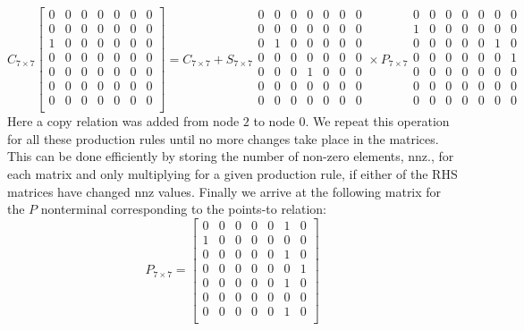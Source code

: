 \[
    C_{7\times 7}
    \begin{bmatrix}
        0 & 0 & 0 & 0 & 0 & 0 & 0 \\
        0 & 0 & 0 & 0 & 0 & 0 & 0 \\
        1 & 0 & 0 & 0 & 0 & 0 & 0 \\
        0 & 0 & 0 & 0 & 0 & 0 & 0 \\
        0 & 0 & 0 & 0 & 0 & 0 & 0 \\
        0 & 0 & 0 & 0 & 0 & 0 & 0 \\
        0 & 0 & 0 & 0 & 0 & 0 & 0 \\
    \end{bmatrix}
    = C_{7\times 7} +
    S_{7\times 7}
    \begin{smallmatrix}
        0 & 0 & 0 & 0 & 0 & 0 & 0 \\
        0 & 0 & 0 & 0 & 0 & 0 & 0 \\
        0 & 1 & 0 & 0 & 0 & 0 & 0 \\
        0 & 0 & 0 & 0 & 0 & 0 & 0 \\
        0 & 0 & 0 & 1 & 0 & 0 & 0 \\
        0 & 0 & 0 & 0 & 0 & 0 & 0 \\
        0 & 0 & 0 & 0 & 0 & 0 & 0 \\
    \end{smallmatrix}
    \times
    P_{7\times 7}
    \begin{smallmatrix}
        0 & 0 & 0 & 0 & 0 & 0 & 0 \\
        1 & 0 & 0 & 0 & 0 & 0 & 0 \\
        0 & 0 & 0 & 0 & 0 & 1 & 0 \\
        0 & 0 & 0 & 0 & 0 & 0 & 1 \\
        0 & 0 & 0 & 0 & 0 & 0 & 0 \\
        0 & 0 & 0 & 0 & 0 & 0 & 0 \\
        0 & 0 & 0 & 0 & 0 & 0 & 0 \\
    \end{smallmatrix}
\]
Here a copy relation was added from node $2$ to node $0$.
We repeat this operation for all these production rules until no more changes take place in the matrices.
This can be done efficiently by storing the number of non-zero elements, nnz., for each matrix and only multiplying for a given production rule, if either of the RHS matrices have changed nnz values.
Finally we arrive at the following matrix for the $P$ nonterminal corresponding to the points-to relation:
\[
    P_{7\times 7} =
    \begin{bmatrix}
        0 & 0 & 0 & 0 & 0 & 1 & 0 \\
        1 & 0 & 0 & 0 & 0 & 0 & 0 \\
        0 & 0 & 0 & 0 & 0 & 1 & 0 \\
        0 & 0 & 0 & 0 & 0 & 0 & 1 \\
        0 & 0 & 0 & 0 & 0 & 1 & 0 \\
        0 & 0 & 0 & 0 & 0 & 0 & 0 \\
        0 & 0 & 0 & 0 & 0 & 1 & 0 \\
    \end{bmatrix}
\]
